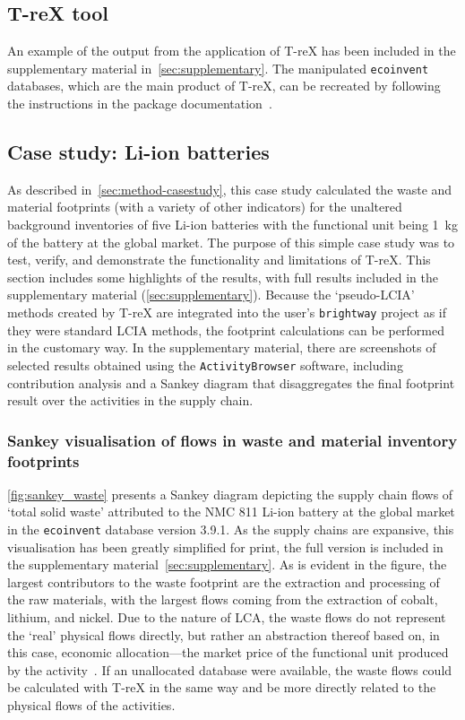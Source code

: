 \subsection{T-reX tool}\label{sec:results-T-reX}

An example of the output from the application of T-reX has been included in the supplementary material in~\autoref{sec:supplementary}. The manipulated \texttt{ecoinvent} databases, which are the main product of T-reX, can be recreated by following the instructions in the package documentation~\citep{mcdowall2023T-reXdocs}.

\subsection{Case study: Li-ion batteries}\label{sec:results-casestudy}

As described in~\autoref{sec:method-casestudy}, this case study calculated the waste and material footprints (with a variety of other indicators) for the unaltered background inventories of five Li-ion batteries with the functional unit being 1~kg of the battery at the global market. The purpose of this simple case study was to test, verify, and demonstrate the functionality and limitations of T-reX. This section includes some highlights of the results, with full results included in the supplementary material (\autoref{sec:supplementary}). Because the `pseudo-LCIA' methods created by T-reX are integrated into the user's \texttt{brightway} project as if they were standard LCIA methods, the footprint calculations can be performed in the customary way. In the supplementary material, there are screenshots of selected results obtained using the \texttt{ActivityBrowser} software, including contribution analysis and a Sankey diagram that disaggregates the final footprint result over the activities in the supply chain.

\subsubsection{Sankey visualisation of flows in waste and material inventory footprints}\label{sec:results-case_study-sankey}

\autoref{fig:sankey_waste} presents a Sankey diagram depicting the supply chain flows of `total solid waste' attributed to the NMC 811 Li-ion battery at the global market in the \texttt{ecoinvent} database version 3.9.1. As the supply chains are expansive, this visualisation has been greatly simplified for print, the full version is included in the supplementary material~\autoref{sec:supplementary}. As is evident in the figure, the largest contributors to the waste footprint are the extraction and processing of the raw materials, with the largest flows coming from the extraction of cobalt, lithium, and nickel. Due to the nature of LCA, the waste flows do not represent the `real' physical flows directly, but rather an abstraction thereof based on, in this case, economic allocation---the market price of the functional unit produced by the activity~\citep{guinee2004economicallocation}. If an unallocated database were available, the waste flows could be calculated with T-reX in the same way and be more directly related to the physical flows of the activities.

